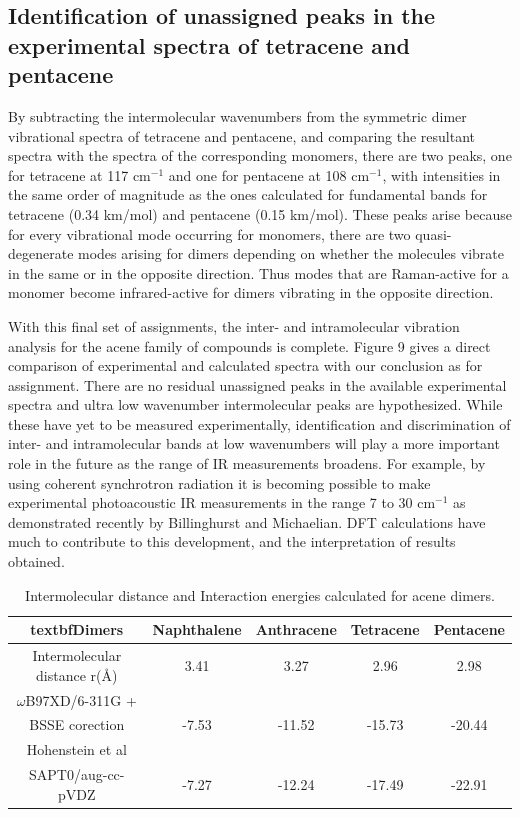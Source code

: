 \singlespacing
\subsection{Identification of unassigned peaks in the experimental spectra of tetracene and pentacene}


 By subtracting the intermolecular wavenumbers from the symmetric dimer vibrational spectra of tetracene and pentacene, and comparing the resultant spectra with the spectra of the corresponding monomers, there are two peaks, one for tetracene at 117 cm$^{-1}$ and one for pentacene at 108 cm$^{-1}$, with intensities in the same order of magnitude as the ones calculated for fundamental bands for tetracene (0.34 km/mol) and pentacene (0.15 km/mol). These peaks arise because for every vibrational mode occurring for monomers, there are two quasi-degenerate modes arising for dimers depending on whether the molecules vibrate in the same or in the opposite direction. Thus modes that are Raman-active for a monomer become infrared-active for dimers vibrating in the opposite direction. 
 
 With this final set of assignments, the inter- and intramolecular vibration analysis for the acene family of compounds is complete. Figure 9 gives a direct comparison of experimental and calculated spectra with our conclusion as for assignment. There are no residual unassigned peaks in the available experimental spectra and ultra low wavenumber intermolecular peaks are hypothesized.  While these have yet to be measured experimentally, identification and discrimination of inter- and intramolecular bands at low wavenumbers will play a more important role in the future as the range of IR measurements broadens. For example, by using coherent synchrotron radiation it is becoming possible to make experimental photoacoustic IR measurements in the range 7 to 30 cm$^{-1}$ as demonstrated recently by Billinghurst and Michaelian\cite{billinghurst2010photoacoustic}. DFT calculations have much to contribute to this development, and the interpretation of results obtained.
 
 
 \begin{table}[htb]
 	\caption{Intermolecular distance and Interaction energies calculated for acene dimers.}
 	\begin{center}
 		\begin{tabular}{c c c c c}
 			\toprule
 			textbf{Dimers} & \textbf{Naphthalene} & \textbf{Anthracene} & \textbf{Tetracene} & \textbf{Pentacene}\\
 			\midrule
 			Intermolecular distance r(\AA) & 3.41 &3.27 & 2.96 & 2.98 \\
 		 	 $\omega$B97XD/6-311G + &  & & & \\
 		 	 BSSE corection & -7.53 & -11.52 & -15.73 & -20.44\\
 		 	 Hohenstein et al\cite{hohenstein2010density} & & & & \\
 		 	 SAPT0/aug-cc-pVDZ &-7.27 &  	-12.24 & -17.49 & -22.91\\ 
 		 	 \bottomrule		 		 				
 		\end{tabular}
 	\end{center}
 \end{table}
 
